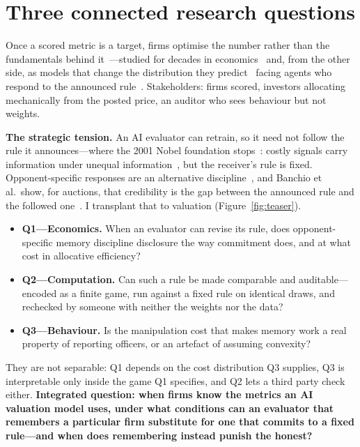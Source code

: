 \section{Three connected research questions}
Once a scored metric is a target, firms optimise the number rather than the
fundamentals behind it~\cite{strathern1997}---studied for decades in
economics~\cite{healy1999,stein1989,brown2019} and, from the other side, as
models that change the distribution they predict~\cite{perdomo2020} facing
agents who respond to the announced rule~\cite{hardt2016}. Stakeholders: firms
scored, investors allocating mechanically from the posted price, an auditor who
sees behaviour but not weights.

\textbf{The strategic tension.} An AI evaluator can retrain, so it need not
follow the rule it announces---where the 2001 Nobel foundation
stops~\cite{nobel2001}: costly signals carry information under unequal
information~\cite{spence1973}, but the receiver's rule is fixed.
Opponent-specific responses are an alternative
discipline~\cite{morozov2026,leung2026}, and Banchio et al.\ show, for auctions,
that credibility is the gap between the announced rule and the followed
one~\cite{banchio2025}. I transplant that to valuation
(Figure~\ref{fig:teaser}).

\begin{itemize}
\item \textbf{Q1---Economics.} When an evaluator can revise its rule, does
opponent-specific memory discipline disclosure the way commitment does, and at
what cost in allocative efficiency?
\item \textbf{Q2---Computation.} Can such a rule be made comparable and
auditable---encoded as a finite game, run against a fixed rule on identical
draws, and rechecked by someone with neither the weights nor the data?
\item \textbf{Q3---Behaviour.} Is the manipulation cost that makes memory work a
real property of reporting officers, or an artefact of assuming convexity?
\end{itemize}

They are not separable: Q1 depends on the cost distribution Q3 supplies, Q3 is
interpretable only inside the game Q1 specifies, and Q2 lets a third party check
either. \textbf{Integrated question: when firms
know the metrics an AI valuation model uses, under what conditions can an
evaluator that remembers a particular firm substitute for one that commits to a
fixed rule---and when does remembering instead punish the honest?}

